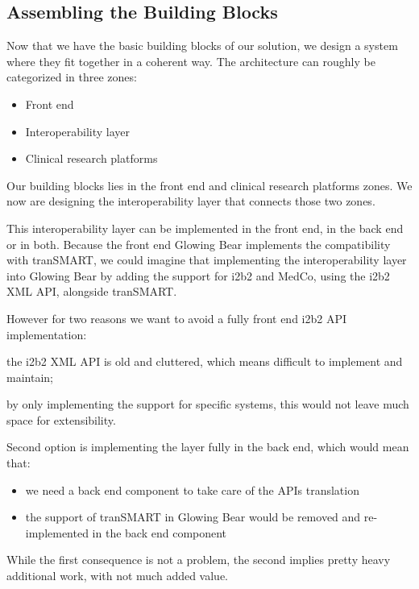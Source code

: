 \subsection{Assembling the Building Blocks}

Now that we have the basic building blocks of our solution, we design a system where they fit together in a coherent way.
The architecture can roughly be categorized in three zones:
\begin{itemize}
    \item Front end
    \item Interoperability layer
    \item Clinical research platforms
\end{itemize}
Our building blocks lies in the front end and clinical research platforms zones. 
We now are designing the interoperability layer that connects those two zones.

This interoperability layer can be implemented in the front end, in the back end or in both.
Because the front end Glowing Bear implements the compatibility with tranSMART, we could imagine that implementing the interoperability layer into Glowing Bear by adding the support for i2b2 and MedCo, using the i2b2 XML API, alongside tranSMART.

However for two reasons we want to avoid a fully front end i2b2 API implementation: 
\begin{enumerate*}
    \item the i2b2 XML API is old and cluttered, which means difficult to implement and maintain;
    \item by only implementing the support for specific systems, this would not leave much space for extensibility.
\end{enumerate*}

\begin{samepage}
Second option is implementing the layer fully in the back end, which would mean that:
\begin{itemize}
    \item we need a back end component to take care of the APIs translation
    \item the support of tranSMART in Glowing Bear would be removed and re-implemented in the back end component
\end{itemize}
While the first consequence is not a problem, the second implies pretty heavy additional work, with not much added value.
\end{samepage}


